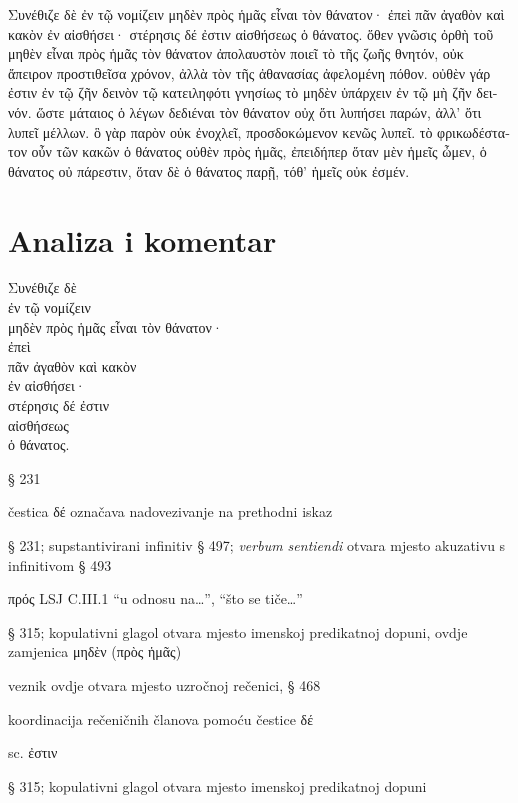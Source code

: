 {\large

\begin{greek}

\noindent Συνέθιζε δὲ ἐν τῷ νομίζειν μηδὲν πρὸς ἡμᾶς εἶναι τὸν θάνατον· ἐπεὶ πᾶν ἀγαθὸν καὶ κακὸν ἐν αἰσθήσει· στέρησις δέ ἐστιν αἰσθήσεως ὁ θάνατος. ὅθεν γνῶσις ὀρθὴ τοῦ μηθὲν εἶναι πρὸς ἡμᾶς τὸν θάνατον ἀπολαυστὸν ποιεῖ τὸ τῆς ζωῆς θνητόν, οὐκ ἄπειρον προστιθεῖσα χρόνον, ἀλλὰ τὸν τῆς ἀθανασίας ἀφελομένη πόθον. οὐθὲν γάρ ἐστιν ἐν τῷ ζῆν δεινὸν τῷ κατειληφότι γνησίως τὸ μηδὲν ὑπάρχειν ἐν τῷ μὴ ζῆν δεινόν. ὥστε μάταιος ὁ λέγων δεδιέναι τὸν θάνατον οὐχ ὅτι λυπήσει παρών, ἀλλ' ὅτι λυπεῖ μέλλων. ὃ γὰρ παρὸν οὐκ ἐνοχλεῖ, προσδοκώμενον κενῶς λυπεῖ. τὸ φρικωδέστατον οὖν τῶν κακῶν ὁ θάνατος οὐθὲν πρὸς ἡμᾶς, ἐπειδήπερ ὅταν μὲν ἡμεῖς ὦμεν, ὁ θάνατος οὐ πάρεστιν, ὅταν δὲ ὁ θάνατος παρῇ, τόθ' ἡμεῖς οὐκ ἐσμέν.

\end{greek}

}


\section*{Analiza i komentar}


{\large
\begin{greek}
\noindent Συνέθιζε δὲ \\
\tabto{2em} ἐν τῷ νομίζειν \\
μηδὲν πρὸς ἡμᾶς εἶναι τὸν θάνατον· \\
ἐπεὶ \\
\tabto{2em} πᾶν ἀγαθὸν καὶ κακὸν \\
\tabto{2em} ἐν αἰσθήσει· \\
στέρησις δέ ἐστιν \\
\tabto{2em} αἰσθήσεως \\
ὁ θάνατος.\\

\end{greek}
}

\begin{description}[noitemsep]
\item[Συνέθιζε] § 231
\item[δὲ] čestica δέ označava nadovezivanje na prethodni iskaz
\item[ἐν τῷ νομίζειν] § 231; supstantivirani infinitiv § 497; \textit{verbum sentiendi} otvara mjesto akuzativu s infinitivom § 493
\item[πρὸς ἡμᾶς] πρός LSJ C.III.1 ``u odnosu na\dots'', ``što se tiče\dots''
\item[εἶναι] § 315; kopulativni glagol otvara mjesto imenskoj predikatnoj dopuni, ovdje zamjenica μηδὲν (πρὸς ἡμᾶς)
\item[ἐπεὶ] veznik ovdje otvara mjesto uzročnoj rečenici, § 468
\item[πᾶν ἀγαθὸν\dots\ στέρησις δέ\dots] koordinacija rečeničnih članova pomoću čestice δέ
\item[ἐν αἰσθήσει] sc. ἐστιν
\item[ἐστιν] § 315; kopulativni glagol otvara mjesto imenskoj predikatnoj dopuni

\end{description}

